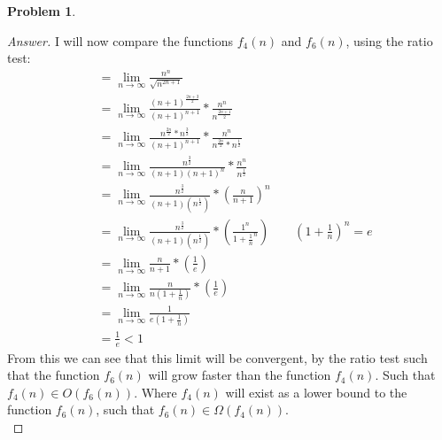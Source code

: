 \documentclass[11pt]{article}
\theoremstyle{definition}
\theoremstyle{definition}
\newtheorem{required}{Problem}
\theoremstyle{definition}
\begin{document}
\begin{required}
\begin{enumerate}[label=(\alph*)]
\begin{proof}[Answer]
I will now compare the functions $f_4(n)$ and $f_6(n)$, using the ratio test: \\
\begin{align*}
&= \lim_{n \to \infty} \frac{n^{n}}{\sqrt {n^{2n+1}}} \\
&= \lim_{n \to \infty} \frac{(n+1)^{\frac{2n+3}{2}}}{(n+1)^{n+1}} * \frac{n^n}{n^{\frac{2n+1}{2}}}\\
&= \lim_{n \to \infty} \frac{n^{\frac{2n}{2}}*n^{\frac{3}{2}}}{(n+1)^{n+1}} * \frac{n^{n}}{n^{\frac{2n}{2}}*n^{\frac{1}{2}}} \\
&= \lim_{n \to \infty} \frac{n^{\frac{3}{2}}}{(n+1)(n+1)^{n}} * \frac{n^{n}}{n^{\frac{1}{2}}} \\
&= \lim_{n \to \infty} \frac{n^{\frac{3}{2}}}{(n+1)(n^{\frac{1}{2}})} * (\frac{n}{n+1})^{n} \\ 
&= \lim_{n \to \infty} \frac{n^{\frac{3}{2}}}{(n+1)(n^{\frac{1}{2}})} * (\frac{1^{n}}{1+\frac{1}{n}^{n}}) \qquad (1+\frac{1}{n})^{n} = e \\
&= \lim_{n \to \infty} \frac{n}{n+1} * (\frac{1}{e}) \\
&= \lim_{n \to \infty} \frac{n}{n(1+\frac{1}{n})} * (\frac{1}{e}) \\
&= \lim_{n \to \infty} \frac{1}{e(1+\frac{1}{n})} \\
&= \frac{1}{e} < 1
\end{align*}
From this we can see that this limit will be convergent, by the ratio test such that the function $f_6(n)$ will grow faster than the function $f_4(n)$. Such that $f_4(n) \in O(f_6(n))$. Where $f_4(n)$ will exist as a lower bound to the function $f_6(n)$, such that  $f_6(n) \in \Omega(f_4(n))$. \\


\end{proof}
\end{enumerate}
\end{required}
\end{document}
